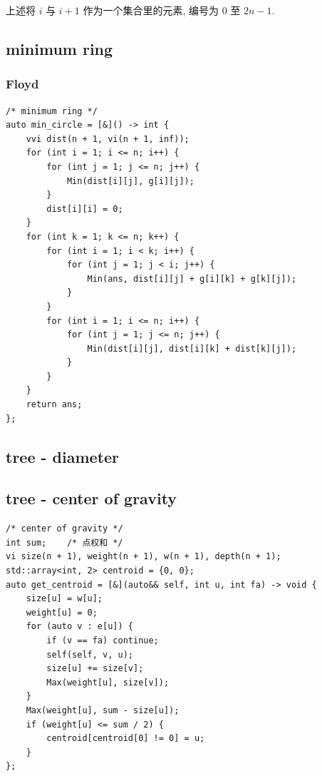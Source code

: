 \documentclass[UTF8, a4paper, titlepage, twoside]{ctexart}
\begin{document}
上述将 \(i\) 与 \(i + 1\) 作为一个集合里的元素, 编号为 \(0\) 至 \(2n - 1\).

\subsection{ minimum ring }
\subsubsection*{ Floyd }
\begin{lstlisting}[style=cpp]
/* minimum ring */
auto min_circle = [&]() -> int {
    vvi dist(n + 1, vi(n + 1, inf));
    for (int i = 1; i <= n; i++) {
        for (int j = 1; j <= n; j++) {
            Min(dist[i][j], g[i][j]);
        }
        dist[i][i] = 0;
    }
    for (int k = 1; k <= n; k++) {
        for (int i = 1; i < k; i++) {
            for (int j = 1; j < i; j++) {
                Min(ans, dist[i][j] + g[i][k] + g[k][j]);
            }
        }
        for (int i = 1; i <= n; i++) {
            for (int j = 1; j <= n; j++) {
                Min(dist[i][j], dist[i][k] + dist[k][j]);
            }
        }
    }
    return ans;
};
\end{lstlisting}

\subsection*{ tree - diameter }

\subsection{ tree - center of gravity }
\begin{lstlisting}[style=cpp]
/* center of gravity */
int sum;    /* 点权和 */
vi size(n + 1), weight(n + 1), w(n + 1), depth(n + 1);
std::array<int, 2> centroid = {0, 0};
auto get_centroid = [&](auto&& self, int u, int fa) -> void {
    size[u] = w[u];
    weight[u] = 0;
    for (auto v : e[u]) {
        if (v == fa) continue;
        self(self, v, u);
        size[u] += size[v];
        Max(weight[u], size[v]);
    }
    Max(weight[u], sum - size[u]);
    if (weight[u] <= sum / 2) {
        centroid[centroid[0] != 0] = u;
    }
};
\end{lstlisting}
\end{document}
